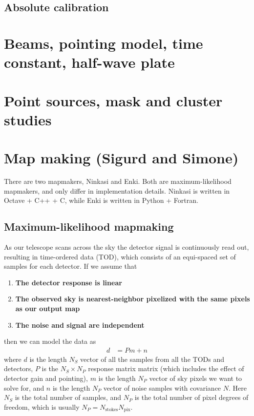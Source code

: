 \documentclass[a4paper, 11pt]{article}
\newcommand{\assume}[1]{{\bf#1}}
\begin{document}
\subsection{Absolute calibration}



\section{Beams, pointing model, time constant, half-wave plate}

\section{Point sources, mask and cluster studies}

\section{Map making (Sigurd and Simone)}
There are two mapmakers, Ninkasi and Enki. Both are maximum-likelihood mapmakers,
and only differ in implementation details. Ninkasi is written in Octave + C++ + C,
while Enki is written in Python + Fortran.

\subsection{Maximum-likelihood mapmaking}
As our telescope scans across the sky the detector signal is continuously read out,
resulting in time-ordered data (TOD), which consists of an equi-spaced set of samples
for each detector. If we assume that
\begin{enumerate}
	\item \assume{The detector response is linear}
	\item \assume{The observed sky is nearest-neighbor pixelized with the same pixels as our output map}
	\item \assume{The noise and signal are independent}
\end{enumerate}
then we can model the data as
\begin{align}
	d &= Pm + n
\end{align}
where $d$ is the length $N_S$ vector of all the samples from all the
TODs and detectors, $P$ is the $N_S\times N_P$ response
matrix matrix (which includes the effect of detector gain and pointing),
$m$ is the length $N_P$ vector of sky pixels we want to solve for, and
$n$ is the length $N_P$ vector of noise samples with covariance $N$. Here $N_S$ is the
total number of samples, and $N_P$ is the total number of pixel degrees
of freedom, which is usually $N_P = N_\textrm{stokes}N_\textrm{pix}$.
\end{document}
